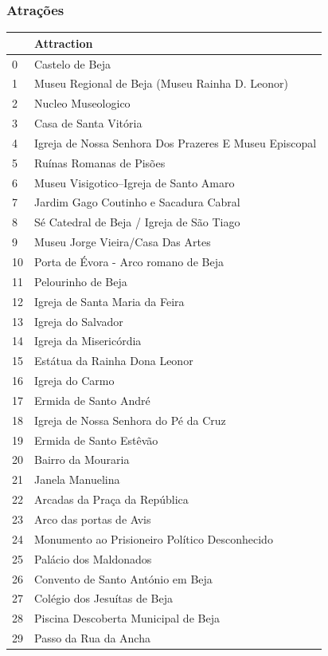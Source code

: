 \documentclass[a4paper,10pt]{article}
\begin{document}
\newpage

\subsubsection{Atrações}

\begin{table}[!ht]
  \centering
  \begin{tabular}{|l|l|}
  \hline
      ~ & Attraction \\ \hline
      0 & Castelo de Beja \\ \hline
      1 & Museu Regional de Beja (Museu Rainha D. Leonor) \\ \hline
      2 & Nucleo Museologico \\ \hline
      3 & Casa de Santa Vitória \\ \hline
      4 & Igreja de Nossa Senhora Dos Prazeres E Museu Episcopal \\ \hline
      5 & Ruínas Romanas de Pisões \\ \hline
      6 & Museu Visigotico--Igreja de Santo Amaro \\ \hline
      7 & Jardim Gago Coutinho e Sacadura Cabral \\ \hline
      8 & Sé Catedral de Beja / Igreja de São Tiago \\ \hline
      9 & Museu Jorge Vieira/Casa Das Artes \\ \hline
      10 & Porta de Évora - Arco romano de Beja \\ \hline
      11 & Pelourinho de Beja \\ \hline
      12 & Igreja de Santa Maria da Feira \\ \hline
      13 & Igreja do Salvador \\ \hline
      14 & Igreja da Misericórdia \\ \hline
      15 & Estátua da Rainha Dona Leonor \\ \hline
      16 & Igreja do Carmo \\ \hline
      17 & Ermida de Santo André \\ \hline
      18 & Igreja de Nossa Senhora do Pé da Cruz \\ \hline
      19 & Ermida de Santo Estêvão \\ \hline
      20 & Bairro da Mouraria \\ \hline
      21 & Janela Manuelina \\ \hline
      22 & Arcadas da Praça da República \\ \hline
      23 & Arco das portas de Avis \\ \hline
      24 & Monumento ao Prisioneiro Político Desconhecido \\ \hline
      25 & Palácio dos Maldonados \\ \hline
      26 & Convento de Santo António em Beja \\ \hline
      27 & Colégio dos Jesuítas de Beja \\ \hline
      28 & Piscina Descoberta Municipal de Beja \\ \hline
      29 & Passo da Rua da Ancha \\ \hline
  \end{tabular}
\end{table}
\end{document}
